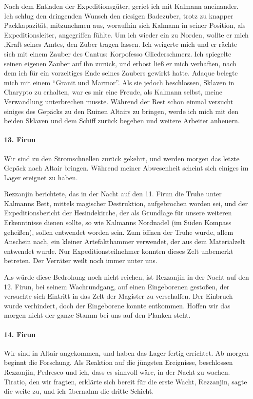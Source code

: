 Nach dem Entladen der Expeditionsgüter, geriet ich mit Kalmann aneinander. Ich schlug den dringenden Wunsch den riesigen Badezuber, trotz zu knapper Packkapazität, mitzunehmen aus, woraufhin sich Kalmann in seiner Position, als Expeditionsleiter, angegriffen fühlte. Um ich wieder ein zu Norden, wollte er mich ,Kraft seines Amtes, den Zuber tragen lassen. Ich weigerte mich und er rächte sich mit einem Zauber des Cantus: Korpofesso Gliederschmerz. Ich spiegelte seinen eigenen Zauber auf ihn zurück, und erbost ließ er mich verhaften, nach dem ich für ein vorzeitiges Ende seines Zaubers gewirkt hatte. Adaque belegte mich mit einem ``Granit und Marmor''. Als sie jedoch beschlossen, Sklaven in Charypto zu erhalten, war es mir eine Freude, als Kalmann selbst, meine Verwandlung unterbrechen musste. Während der Rest schon einmal versucht einiges des Gepäcks zu den Ruinen Altairs zu bringen, werde ich mich mit den beiden Sklaven und dem Schiff zurück begeben und weitere Arbeiter anheuern.

\paragraph{13. Firun}
Wir sind zu den Stromschnellen zurück gekehrt, und werden morgen das letzte Gepäck nach Altair bringen. Während meiner Abwesenheit scheint sich einiges im Lager ereignet zu haben.

Rezzanjin berichtete, das in der Nacht auf den 11. Firun die Truhe unter Kalmanns Bett, mittels magischer Destruktion, aufgebrochen worden sei, und der Expeditionsbericht der Hesindekirche, der als Grundlage für unsere weiteren Erkenntnisse dienen sollte, so wie Kalmanns Nordnadel (im Süden Kompass geheißen), sollen entwendet worden sein. Zum öffnen der Truhe wurde, allem Anschein nach, ein kleiner Artefakthammer verwendet, der aus dem Materialzelt entwendet wurde. Nur Expeditionsteilnehmer konnten dieses Zelt unbemerkt betreten. Der Verräter weilt noch immer unter uns.

Als würde diese Bedrohung noch nicht reichen, ist Rezzanjin in der Nacht auf den 12. Firun, bei seinem Wachrundgang, auf einen Eingeborenen gestoßen, der versuchte sich Eintritt in das Zelt der Magister zu verschaffen. Der Einbruch wurde verhindert, doch der Eingeborene konnte entkommen. Hoffen wir das morgen nicht der ganze Stamm bei uns auf den Planken steht.

\paragraph{14. Firun}
Wir sind in Altair angekommen, und haben das Lager fertig errichtet. Ab morgen beginnt die Forschung. Als Reaktion auf die jüngsten Ereignisse, beschlossen Rezzanjin, Pedresco und ich, dass es sinnvoll wäre, in der Nacht zu wachen. Tiratio, den wir fragten, erklärte sich bereit für die erste Wacht, Rezzanjin, sagte die weite zu, und ich übernahm die dritte Schicht.


